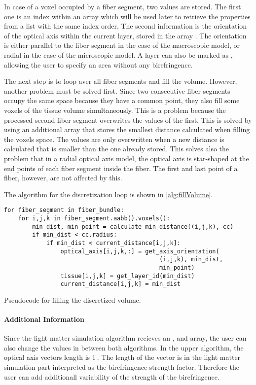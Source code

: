 \par
%
In case of a voxel occupied by a fiber segment, two values are stored.
The first one is an index within an array  which will be used later to retrieve the properties from a list with the same index order.
The second information is the orientation of the optical axis within the current layer, stored in the array .
The orientation is either parallel to the fiber segment in the case of the macroscopic model, or radial in the case of the microscopic model.
A layer can also be marked as , allowing the user to specify an area without any birefringence.
\par
%
The next step is to loop aver all fiber segments and fill the volume.
However, another problem must be solved first.
Since two consecutive fiber segments occupy the same space because they have a common point, they also fill some voxels of the tissue volume simultaneously.
This is a problem because the processed second fiber segment overwrites the values of the first.
This is solved by using an additional array that stores the smallest distance calculated when filling the voxels space.
The values are only overwritten when a new distance is calculated that is smaller than the one already stored.
This solves also the problem that in a radial optical axis model, the optical axis is star-shaped at the end points of each fiber segment inside the fiber.
The first and last point of a fiber, however, are not affected by this.
\par
%
The algorithm for the discretization loop is shown in \cref{alg:fillVolume}.
%
\begin{lstfloat}[!tb]
\lstset{style=python}
\begin{lstlisting}[]
for fiber_segment in fiber_bundle:
    for i,j,k in fiber_segment.aabb().voxels():
        min_dist, min_point = calculate_min_distance((i,j,k), cc)
        if min_dist < cc.radius:
            if min_dist < current_distance[i,j,k]:
                optical_axis[i,j,k,:] = get_axis_orientation(
                                            (i,j,k), min_dist,
                                            min_point)
                tissue[i,j,k] = get_layer_id(min_dist)
                current_distance[i,j,k] = min_dist
\end{lstlisting}
\caption{Pseudocode for filling the discretized volume.}
\label{alg:fillVolume}
\end{lstfloat}
%
\paragraph{Additional Information}
Since the light matter simulation algorithm recieves an ,  and  array, the user can also change the values in between both algorithms.
In the upper algorithm, the optical axis vectors length is $\SI{1}{}$.
The length of the vector is in the light matter simulation part interpreted as the birefringence strength factor.
Therefore the user can \eg{} add additionall variability of the strength of the birefringence.
%
%
%
